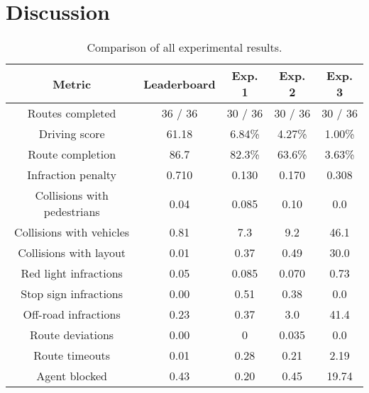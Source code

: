 \chapter{Discussion}
\label{chap:discussion}


\begin{table}[]
    \centering
    \begin{tabular}{|c|c|c|c|c|}
        \hline
        \textbf{Metric} & \textbf{Leaderboard} & \textbf{Exp. 1} & \textbf{Exp. 2} & \textbf{Exp. 3} \\ \hline
        Routes completed &
            36 / 36 &   30 / 36 &   30 / 36 & 30 / 36 \\ \hline
        Driving score &
            61.18   &   6.84\%  &   4.27\%  &   1.00\%  \\ \hline
        Route completion &
            86.7    &   82.3\%  &   63.6\%  &   3.63\%  \\ \hline
        Infraction penalty &
            0.710    &  0.130   &  0.170    &   0.308   \\ \hline
        Collisions with pedestrians &
            0.04    &   0.085   &   0.10    &   0.0     \\ \hline
        Collisions with vehicles &
            0.81    &   7.3     &   9.2     &  46.1     \\ \hline
        Collisions with layout &
            0.01    &   0.37    &   0.49    &  30.0     \\ \hline
        Red light infractions &
            0.05    &   0.085   &   0.070   &   0.73    \\ \hline
        Stop sign infractions &
            0.00    &   0.51    &   0.38    &   0.0     \\ \hline
        Off-road infractions &
            0.23    &   0.37    &   3.0     &  41.4     \\ \hline
        Route deviations &
            0.00    &   0       &   0.035   &   0.0     \\ \hline
        Route timeouts &
            0.01    &   0.28    &   0.21    &   2.19    \\ \hline
        Agent blocked &
            0.43    &   0.20    &   0.45    &  19.74    \\ \hline
    \end{tabular}
    \caption{Comparison of all experimental results.}
    \label{tab:discussion:comparison}
\end{table}

